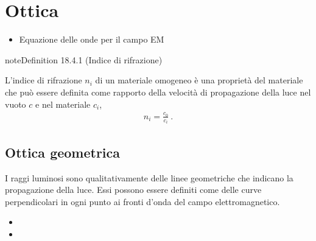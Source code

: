 \documentclass[letterpaper,10pt,italian]{jupyterBook}
\begin{document}
\section{Ottica}
\label{\detokenize{ch/waves/intro:ottica}}\label{\detokenize{ch/waves/intro:physics-hs-waves-optics}}
\sphinxAtStartPar
{}
\begin{itemize}
\item {} 
\sphinxAtStartPar
Equazione delle onde per il campo EM

\end{itemize}
\label{ch/waves/intro:refraction-index}
\begin{sphinxadmonition}{note}{Definition 18.4.1 (Indice di rifrazione)}



\sphinxAtStartPar
L’indice di rifrazione \(n_i\) di un materiale omogeneo è una proprietà del materiale che può essere definita come rapporto della velocità di propagazione della luce nel vuoto \(c\) e nel materiale \(c_i\),
\begin{equation*}
\begin{split}n_i = \frac{c_0}{c_i} \ .\end{split}
\end{equation*}\end{sphinxadmonition}


\subsection{Ottica geometrica}
\label{\detokenize{ch/waves/intro:ottica-geometrica}}\label{\detokenize{ch/waves/intro:physics-hs-waves-optics-geometric}}
\sphinxAtStartPar
{} I raggi luminosi sono qualitativamente delle linee geometriche che indicano la propagazione della luce. Essi possono essere definiti come delle curve perpendicolari in ogni punto ai fronti d’onda del campo elettromagnetico.

\sphinxAtStartPar
{}
\begin{itemize}
\item {} 
\sphinxAtStartPar
{}

\item {} 
\sphinxAtStartPar
{}

\end{itemize}
\end{document}
